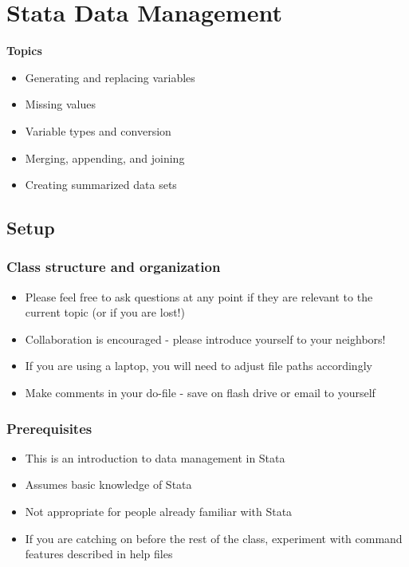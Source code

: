 \documentclass[
]{book}
\providecommand{\tightlist}{%
  \setlength{\itemsep}{0pt}\setlength{\parskip}{0pt}}
\begin{document}
\hypertarget{stata-data-management}{%
\chapter{Stata Data Management}\label{stata-data-management}}

\textbf{Topics}

\begin{itemize}
\tightlist
\item
  Generating and replacing variables
\item
  Missing values
\item
  Variable types and conversion
\item
  Merging, appending, and joining
\item
  Creating summarized data sets
\end{itemize}

\hypertarget{setup-7}{%
\section{Setup}\label{setup-7}}

\hypertarget{class-structure-and-organization-1}{%
\subsection{Class structure and organization}\label{class-structure-and-organization-1}}

\begin{itemize}
\tightlist
\item
  Please feel free to ask questions at any point if they are relevant to the current topic (or if you are lost!)
\item
  Collaboration is encouraged - please introduce yourself to your neighbors!
\item
  If you are using a laptop, you will need to adjust file paths accordingly
\item
  Make comments in your do-file - save on flash drive or email to yourself
\end{itemize}

\hypertarget{prerequisites-7}{%
\subsection{Prerequisites}\label{prerequisites-7}}

\begin{itemize}
\tightlist
\item
  This is an introduction to data management in Stata
\item
  Assumes basic knowledge of Stata
\item
  Not appropriate for people already familiar with Stata
\item
  If you are catching on before the rest of the class, experiment with command features described in help files
\end{itemize}
\end{document}
